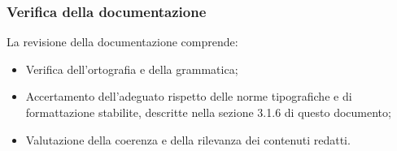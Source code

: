 \subsubsection{Verifica della documentazione}
La revisione della documentazione comprende:
\begin{itemize}
    \item Verifica dell'ortografia e della grammatica;
    \item Accertamento dell'adeguato rispetto delle norme tipografiche e di formattazione stabilite, descritte nella sezione 3.1.6 di questo documento;
    \item Valutazione della coerenza e della rilevanza dei contenuti redatti.
\end{itemize}
